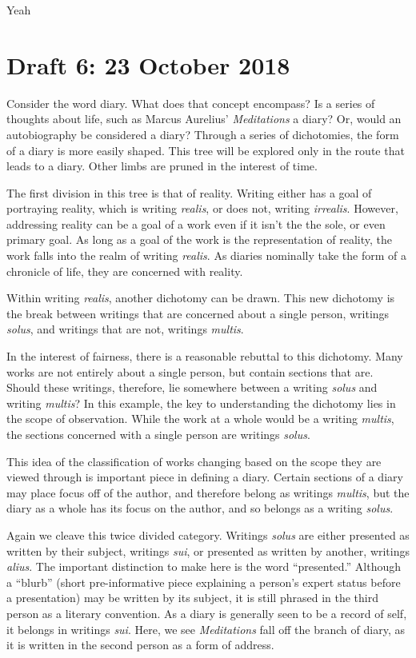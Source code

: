 Yeah \documentclass[12pt]{article}[titlepage]
\newcommand{\say}[1]{``#1''}
\newcommand{\1}{\={a}}
\newcommand{\2}{\={e}}
\newcommand{\3}{\={\i}}
\newcommand{\4}{\=o}
\newcommand{\5}{\=u}
\newcommand{\6}{\={A}}
\renewcommand{\,}{\textsuperscript{,}}
\begin{document}
\section{Draft 6: 23 October 2018}
Consider the word diary.
What does that concept encompass?
Is a series of thoughts about life, such as Marcus Aurelius' \textit{Meditations} a diary?
Or, would an autobiography be considered a diary?
Through a series of dichotomies, the form of a diary is more easily shaped. 
This tree will be explored only in the route that leads to a diary.
Other limbs are pruned in the interest of time.

The first division in this tree is that of reality.
Writing either has a goal of portraying reality, which is writing \textit{realis}, or does not, writing \textit{irrealis}.
However, addressing reality can be a goal of a work even if it isn't the the sole, or even primary goal.
As long as a goal of the work is the representation of reality, the work falls into the realm of writing \textit{realis}.
As diaries nominally take the form of a chronicle of life, they are concerned with reality.

Within writing \textit{realis}, another dichotomy can be drawn.
This new dichotomy is the break between writings that are concerned about a single person, writings \textit{solus}, and writings that are not, writings \textit{multis}.

In the interest of fairness, there is a reasonable rebuttal to this dichotomy.
Many works are not entirely about a single person, but contain sections that are.
Should these writings, therefore, lie somewhere between a writing \textit{solus} and writing \textit{multis}?
In this example, the key to understanding the dichotomy lies in the scope of observation.
While the work at a whole would be a writing \textit{multis}, the sections concerned with a single person are writings \textit{solus}.

This idea of the classification of works changing based on the scope they are viewed through is important piece in defining a diary.
Certain sections of a diary may place focus off of the author, and therefore belong as writings \textit{multis}, but the diary as a whole has its focus on the author, and so belongs as a writing \textit{solus}.

Again we cleave this twice divided category.
Writings \textit{solus} are either presented as written by their subject, writings \textit{sui}, or presented as written by another, writings \textit{alius}.
The important distinction to make here is the word \say{presented.}
Although a \say{blurb} (short pre-informative piece explaining a person's expert status before a presentation) may be written by its subject, it is still phrased in the third person as a literary convention.
As a diary is generally seen to be a record of self, it belongs in writings \textit{sui}.
Here, we see \textit{Meditations} fall off the branch of diary, as it is written in the second person as a form of address. 
\end{document}
